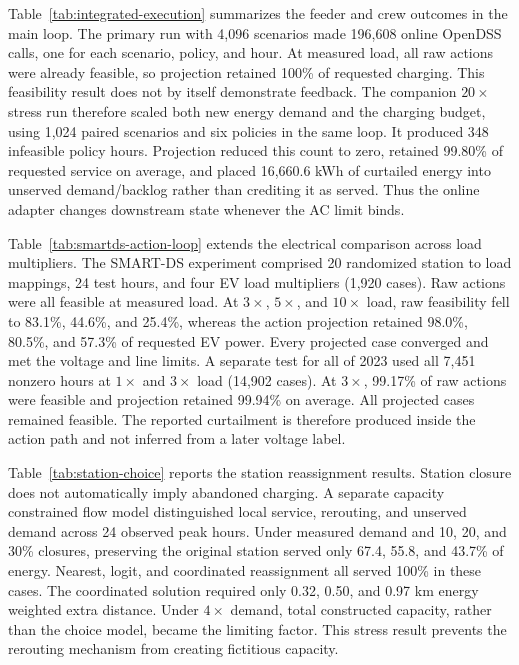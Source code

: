 \documentclass[journal]{IEEEtran}
\begin{document}


Table~\ref{tab:integrated-execution} summarizes the feeder and crew outcomes in
the main loop.  The primary run with 4,096 scenarios made 196,608 online OpenDSS calls, one for each
scenario, policy, and hour.  At measured load, all raw actions were already feasible,
so projection retained 100\% of requested charging.  This feasibility
result does not by itself demonstrate feedback.  The companion $20\times$
stress run therefore scaled both new energy demand and the charging budget,
using 1,024 paired scenarios and six policies in the same loop.  It produced
348 infeasible policy hours.  Projection reduced this count to zero,
retained 99.80\% of requested service on average, and placed 16,660.6 kWh of
curtailed energy into unserved demand/backlog rather than crediting it as served.
Thus the online adapter changes downstream state whenever the AC limit binds.



Table~\ref{tab:smartds-action-loop} extends the electrical comparison across
load multipliers.  The SMART-DS experiment comprised 20 randomized station to load mappings, 24
test hours, and four EV load multipliers (1,920 cases).  Raw actions were all
feasible at measured load.  At $3\times$, $5\times$, and $10\times$ load, raw
feasibility fell to 83.1\%, 44.6\%, and 25.4\%, whereas the action projection
retained 98.0\%, 80.5\%, and 57.3\% of requested EV power.  Every projected
case converged and met the voltage and line limits.  A separate test for all of 2023
used all 7,451 nonzero hours at $1\times$ and $3\times$ load (14,902 cases).
At $3\times$, 99.17\% of raw actions were feasible and projection retained
99.94\% on average.  All projected cases remained feasible.  The reported
curtailment is therefore produced inside the action path and not inferred from
a later voltage label.



Table~\ref{tab:station-choice} reports the station reassignment results.  Station
closure does not automatically imply abandoned charging.  A separate
capacity constrained flow model distinguished local service, rerouting, and
unserved demand across 24 observed peak hours.  Under measured demand and 10,
20, and 30\% closures, preserving the original station served only 67.4, 55.8,
and 43.7\% of energy.  Nearest, logit, and coordinated reassignment all served
100\% in these cases.  The coordinated solution required only 0.32, 0.50, and
0.97 km energy weighted extra distance.  Under $4\times$ demand, total
constructed capacity, rather than the choice model, became the limiting factor.
This stress result prevents the rerouting mechanism from creating fictitious
capacity.
\end{document}
